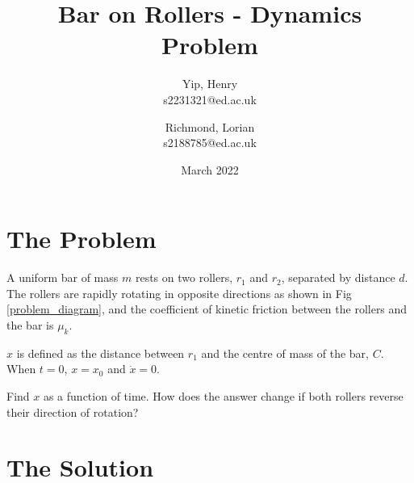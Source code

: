 \documentclass{article}
\title{Bar on Rollers - Dynamics Problem}
\author{
    Yip, Henry\\
    s2231321@ed.ac.uk
    \and
    Richmond, Lorian\\
    s2188785@ed.ac.uk
}
\date{March 2022}
\begin{document}
\maketitle

\section{The Problem}

A uniform bar of mass $m$ rests on two rollers, $r_1$ and $r_2$, separated by distance $d$. The rollers are rapidly rotating in opposite directions as shown in Fig \ref{problem_diagram}, and the coefficient of kinetic friction between the rollers and the bar is $\mu_k$.

$x$ is defined as the distance between $r_1$ and the centre of mass of the bar, $C$. When $t=0$, $x=x_0$ and $\dot{x}=0$.

Find $x$ as a function of time. How does the answer change if both rollers reverse their direction of rotation?

\begin{center}
	\label{problem_diagram}
\end{center}

\section{The Solution}
\end{document}
